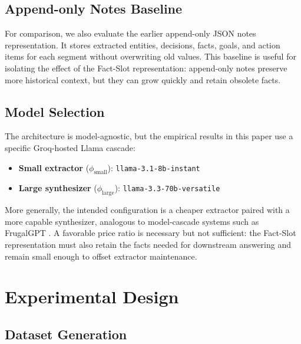 \documentclass[conference]{IEEEtran}
\begin{document}
\subsection{Append-only Notes Baseline}
\label{sec:notes-format}

For comparison, we also evaluate the earlier append-only JSON notes representation. It stores extracted entities, decisions, facts, goals, and action items for each segment without overwriting old values. This baseline is useful for isolating the effect of the Fact-Slot representation: append-only notes preserve more historical context, but they can grow quickly and retain obsolete facts.

\subsection{Model Selection}

The architecture is model-agnostic, but the empirical results in this paper use a specific Groq-hosted Llama cascade:
\begin{itemize}
    \item \textbf{Small extractor} ($\phi_{\text{small}}$): \texttt{llama-3.1-8b-instant}
    \item \textbf{Large synthesizer} ($\phi_{\text{large}}$): \texttt{llama-3.3-70b-versatile}
\end{itemize}

More generally, the intended configuration is a cheaper extractor paired with a more capable synthesizer, analogous to model-cascade systems such as FrugalGPT \cite{chen2023frugalgpt}. A favorable price ratio is necessary but not sufficient: the Fact-Slot representation must also retain the facts needed for downstream answering and remain small enough to offset extractor maintenance.

\section{Experimental Design}
\label{sec:experiments}

\subsection{Dataset Generation}
\end{document}
